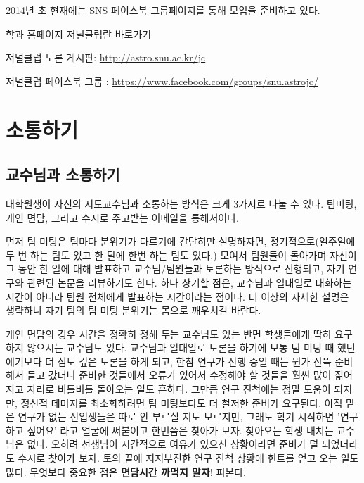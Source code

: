 2014년 초 현재에는 SNS 페이스북 그룹페이지를 통해 모임을 준비하고 있다.
\begin{packed_item}
\item 학과 홈페이지 저널클럽란
  \href{http://astro1.snu.ac.kr/home/kor/Journal/Journal_info.asp?globalmenu=6&localmenu=2}{바로가기}
\item 저널클럽 토론 게시판: \url{http://astro.snu.ac.kr/jc}
\item 저널클럽 페이스북 그룹 :
  \url{https://www.facebook.com/groups/snu.astrojc/}
\end{packed_item}

\section{소통하기}
\subsection{교수님과 소통하기}
대학원생이 자신의 지도교수님과 소통하는 방식은 크게 3가지로 나눌 수
있다. 팀미팅, 개인 면담, 그리고 수시로 주고받는 이메일을 통해서이다.

먼저 팀 미팅은 팀마다 분위기가 다르기에 간단히만 설명하자면, 정기적으로(일주일에
두 번 하는 팀도 있고 한 달에 한번 하는 팀도 있다.) 모여서 팀원들이 돌아가며
자신이 그 동안 한 일에 대해 발표하고 교수님/팀원들과 토론하는 방식으로 진행되고,
자기 연구와 관련된 논문을 리뷰하기도 한다. 하나 상기할 점은, 교수님과 일대일로
대화하는 시간이 아니라 팀원 전체에게 발표하는 시간이라는 점이다. 더 이상의 자세한
설명은 생략하니 자기 팀의 팀 미팅 분위기는 몸으로 깨우치길 바란다.

개인 면담의 경우 시간을 정확히 정해 두는 교수님도 있는 반면 학생들에게 딱히
요구하지 않으시는 교수님도 있다. 교수님과 일대일로 토론을 하기에 보통 팀 미팅 때
했던 얘기보다 더 심도 깊은 토론을 하게 되고, 한참 연구가 진행 중일 때는 뭔가 잔뜩
준비해서 들고 갔더니 준비한 것들에서 오류가 있어서 수정해야 할 것들을 훨씬 많이
짊어지고 자리로 비틀비틀 돌아오는 일도 흔하다. 그만큼 연구 진척에는 정말 도움이
되지만, 정신적 데미지를 최소화하려면 팀 미팅보다도 더 철저한 준비가
요구된다. 아직 맡은 연구가 없는 신입생들은 따로 안 부르실 지도 모르지만, 그래도
학기 시작하면 '연구하고 싶어요' 라고 얼굴에 써붙이고 한번쯤은 찾아가
보자. 찾아오는 학생 내치는 교수님은 없다. 오히려 선생님이 시간적으로 여유가
있으신 상황이라면 준비가 덜 되었더라도 수시로 찾아가 보자. 토의 끝에 지지부진한
연구 진척 상황에 힌트를 얻고 오는 일도 많다. 무엇보다 중요한 점은
\textbf{면담시간 까먹지 말자}! 피본다.

